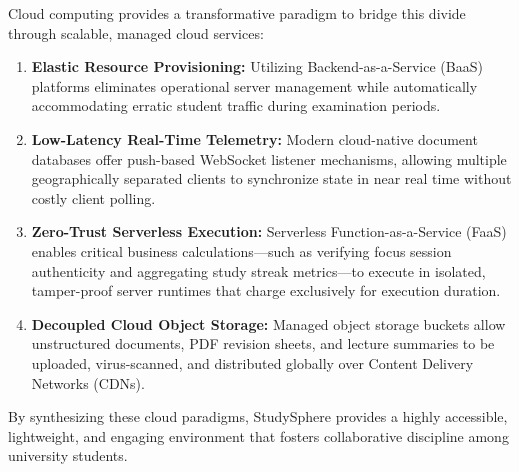 \documentclass[12pt,a4paper,openany]{report}
\begin{document}
Cloud computing provides a transformative paradigm to bridge this divide through scalable, managed cloud services:
\begin{enumerate}[label=(\alph*)]
\item \textbf{Elastic Resource Provisioning:} Utilizing Backend-as-a-Service (BaaS) platforms eliminates operational server management while automatically accommodating erratic student traffic during examination periods.
\item \textbf{Low-Latency Real-Time Telemetry:} Modern cloud-native document databases offer push-based WebSocket listener mechanisms, allowing multiple geographically separated clients to synchronize state in near real time without costly client polling.
\item \textbf{Zero-Trust Serverless Execution:} Serverless Function-as-a-Service (FaaS) enables critical business calculations—such as verifying focus session authenticity and aggregating study streak metrics—to execute in isolated, tamper-proof server runtimes that charge exclusively for execution duration.
\item \textbf{Decoupled Cloud Object Storage:} Managed object storage buckets allow unstructured documents, PDF revision sheets, and lecture summaries to be uploaded, virus-scanned, and distributed globally over Content Delivery Networks (CDNs).
\end{enumerate}
By synthesizing these cloud paradigms, StudySphere provides a highly accessible, lightweight, and engaging environment that fosters collaborative discipline among university students.
 
\end{document}
